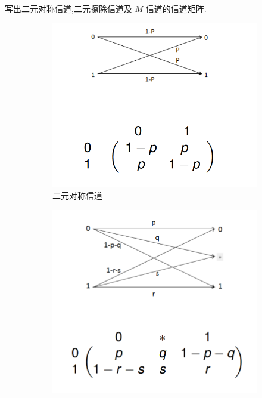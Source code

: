 \begin{exercise}
    写出二元对称信道,二元擦除信道及 $ M $ 信道的信道矩阵.
\end{exercise}
\begin{solution}
    \begin{figure}[h]
  \centering
  \begin{subfigure}[b]{0.3\textwidth}
    \includegraphics[width=\textwidth]{image/8.png}
    \caption{二元对称信道}
    \label{fig:image1}
  \end{subfigure}
  \hfill
  \begin{subfigure}[b]{0.3\textwidth}
    \includegraphics[width=\textwidth]{image/9.png}

\end{subfigure}
\end{figure}
\end{solution}
